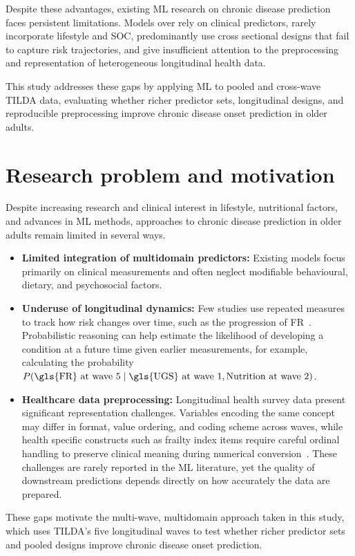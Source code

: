 Despite these advantages, existing \gls{ML} research on chronic disease prediction faces persistent limitations. Models over rely on clinical predictors, rarely incorporate lifestyle and \gls{SOC}, predominantly use cross sectional designs that fail to capture risk trajectories, and give insufficient attention to the preprocessing and representation of heterogeneous longitudinal health data.

This study addresses these gaps by applying \gls{ML} to pooled and cross-wave \gls{TILDA} data, evaluating whether richer predictor sets, longitudinal designs, and reproducible preprocessing improve chronic disease onset prediction in older adults.

\section{Research problem and motivation} 
Despite increasing research and clinical interest in lifestyle, nutritional factors, and advances in \gls{ML} methods, approaches to chronic disease prediction in older adults remain limited in several ways.

\begin{itemize}
    \item \textbf{Limited integration of multidomain predictors:} Existing models focus primarily on clinical measurements and often neglect modifiable behavioural, dietary, and psychosocial factors.
    \item \textbf{Underuse of longitudinal dynamics:} Few studies use repeated measures to track how risk changes over time, such as the progression of \gls{FR}~\cite{moguilnerImportanceAgePrediction2021}.
    Probabilistic reasoning can help estimate the likelihood of developing a condition at a future time given earlier measurements, for example, calculating the probability $P(\text{\gls{FR} at wave 5} \mid \text{\gls{UGS} at wave 1}, \text{Nutrition at wave 2})$.
    \item \textbf{Healthcare data preprocessing:} Longitudinal health survey data present significant representation challenges. Variables encoding the same concept may differ in format, value ordering, and coding scheme across waves, while health specific constructs such as frailty index items require careful ordinal handling to preserve clinical meaning during numerical conversion~\cite{searleStandardProcedureCreating2008}. These challenges are rarely reported in the \gls{ML} literature, yet the quality of downstream predictions depends directly on how accurately the data are prepared.
\end{itemize}
These gaps motivate the multi-wave, multidomain approach taken in this study, which uses \gls{TILDA}'s five longitudinal waves to test whether richer predictor sets and pooled designs improve chronic disease onset prediction.

